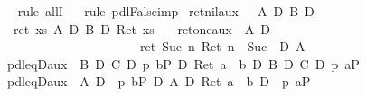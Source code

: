 \begin{isabellebody}
\ \ \isamarkupfalse%
rule\ allI{\isacharparenright}\isanewline
\ \ \isamarkupfalse%
rule\ pdl{\isacharunderscore}False{\isacharunderscore}imp{\isacharparenright}\isanewline
\isamarkupfalse%
\isanewline
\isanewline
\isanewline
\isamarkupfalse%
\ ret{\isacharunderscore}nil{\isacharunderscore}aux{\isacharcolon}\ {\isachardoublequote}\ {\isasymturnstile}\ A\ {\isasymand}\isactrlsub D\ B\ {\isasymlongrightarrow}\isactrlsub D\isanewline
\ \ {\isasymlangle}ret\ {\isacharbrackleft}{\isacharbrackright}{\isasymrangle}{\isacharparenleft}{\isasymlambda}xs{\isachardot}\ A\ {\isasymand}\isactrlsub D\ B\ {\isasymand}\isactrlsub D\ Ret\ {\isacharparenleft}xs\ {\isacharequal}\ {\isacharbrackleft}{\isacharbrackright}{\isacharparenright}{\isacharparenright}{\isachardoublequote}\isamarkupfalse%
\isamarkupfalse%
\isamarkupfalse%
\isanewline
\isanewline
\isamarkupfalse%
\ ret{\isacharunderscore}one{\isacharunderscore}aux{\isacharcolon}\ {\isachardoublequote}{\isasymturnstile}\ A\ {\isasymlongrightarrow}\isactrlsub D\ \isanewline
\ \ \ \ \ \ \ \ \ \ \ \ \ \ \ \ \ \ \ \ \ \ {\isasymlangle}ret\ {\isacharparenleft}Suc\ {}{\isacharparenright}{\isasymrangle}{\isacharparenleft}{\isasymlambda}n{\isachardot}\ Ret\ {\isacharparenleft}n\ {\isacharequal}\ Suc\ {}{\isacharparenright}\ {\isasymand}\isactrlsub D\ A{\isacharparenright}{\isachardoublequote}\isamarkupfalse%
\isamarkupfalse%
\isamarkupfalse%
\isanewline
\isanewline
\isanewline
\isamarkupfalse%
\ pdl{\isacharunderscore}eqD{\isacharunderscore}aux{}{\isacharcolon}\ {\isachardoublequote}{\isasymturnstile}\ {\isacharparenleft}B\ {\isasymand}\isactrlsub D\ C\ {\isasymlongrightarrow}\isactrlsub D\ {\isasymlangle}p\ b{\isasymrangle}P{\isacharparenright}\ {\isasymlongrightarrow}\isactrlsub D\ Ret\ {\isacharparenleft}a\ {\isacharequal}\ b{\isacharparenright}\ {\isasymand}\isactrlsub D\ B\ {\isasymand}\isactrlsub D\ C\ {\isasymlongrightarrow}\isactrlsub D\ {\isasymlangle}p\ a{\isasymrangle}P{\isachardoublequote}\isamarkupfalse%
\isamarkupfalse%
\isamarkupfalse%
\isamarkupfalse%
\isamarkupfalse%
\isamarkupfalse%
\isamarkupfalse%
\isamarkupfalse%
\isamarkupfalse%
\isamarkupfalse%
\isamarkupfalse%
\isamarkupfalse%
\isamarkupfalse%
\isamarkupfalse%
\isamarkupfalse%
\isanewline
\isamarkupfalse%
\ pdl{\isacharunderscore}eqD{\isacharunderscore}aux{}{\isacharcolon}\ {\isachardoublequote}{\isasymturnstile}\ {\isacharparenleft}A\ {\isasymlongrightarrow}\isactrlsub D\ {\isasymlangle}\ p\ b{\isasymrangle}P{\isacharparenright}\ {\isasymlongrightarrow}\isactrlsub D\ A\ {\isasymand}\isactrlsub D\ Ret\ {\isacharparenleft}a\ {\isacharequal}\ b{\isacharparenright}\ {\isasymlongrightarrow}\isactrlsub D\ {\isasymlangle}\ p\ a{\isasymrangle}P{\isachardoublequote}\isamarkupfalse%

\end{isabellebody}
